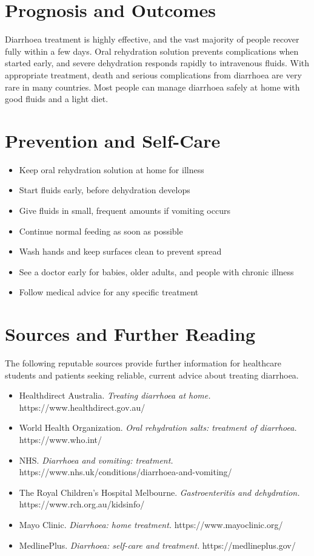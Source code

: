 \section*{Prognosis and Outcomes}
Diarrhoea treatment is highly effective, and the vast majority of people recover fully within a few days. Oral rehydration solution prevents complications when started early, and severe dehydration responds rapidly to intravenous fluids. With appropriate treatment, death and serious complications from diarrhoea are very rare in many countries. Most people can manage diarrhoea safely at home with good fluids and a light diet.

\section*{Prevention and Self-Care}
\begin{itemize}
    \item Keep oral rehydration solution at home for illness
    \item Start fluids early, before dehydration develops
    \item Give fluids in small, frequent amounts if vomiting occurs
    \item Continue normal feeding as soon as possible
    \item Wash hands and keep surfaces clean to prevent spread
    \item See a doctor early for babies, older adults, and people with chronic illness
    \item Follow medical advice for any specific treatment
\end{itemize}

\section*{Sources and Further Reading}
The following reputable sources provide further information for healthcare students and patients seeking reliable, current advice about treating diarrhoea.

\begin{itemize}
    \item Healthdirect Australia. \textit{Treating diarrhoea at home.} https://www.healthdirect.gov.au/
    \item World Health Organization. \textit{Oral rehydration salts: treatment of diarrhoea.} https://www.who.int/
    \item NHS. \textit{Diarrhoea and vomiting: treatment.} https://www.nhs.uk/conditions/diarrhoea-and-vomiting/
    \item The Royal Children's Hospital Melbourne. \textit{Gastroenteritis and dehydration.} https://www.rch.org.au/kidsinfo/
    \item Mayo Clinic. \textit{Diarrhoea: home treatment.} https://www.mayoclinic.org/
    \item MedlinePlus. \textit{Diarrhoea: self-care and treatment.} https://medlineplus.gov/
\end{itemize}
